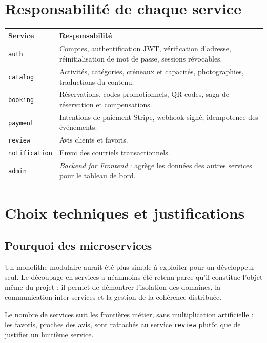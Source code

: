 \documentclass[11pt,a4paper]{report}
\begin{document}
\section{Responsabilité de chaque service}

\begin{longtable}{@{}p{2.6cm}p{11.9cm}@{}}
\toprule
\textbf{Service} & \textbf{Responsabilité} \\
\midrule
\endhead
\texttt{auth} & Comptes, authentification JWT, vérification d'adresse,
réinitialisation de mot de passe, sessions révocables. \\
\addlinespace
\texttt{catalog} & Activités, catégories, créneaux et capacités, photographies,
traductions du contenu. \\
\addlinespace
\texttt{booking} & Réservations, codes promotionnels, QR codes,
saga de réservation et compensations. \\
\addlinespace
\texttt{payment} & Intentions de paiement Stripe, webhook signé, idempotence
des événements. \\
\addlinespace
\texttt{review} & Avis clients et favoris. \\
\addlinespace
\texttt{notification} & Envoi des courriels transactionnels. \\
\addlinespace
\texttt{admin} & \emph{Backend for Frontend} : agrège les données des autres
services pour le tableau de bord. \\
\bottomrule
\end{longtable}

\section{Choix techniques et justifications}

\subsection{Pourquoi des microservices}

Un monolithe modulaire aurait été plus simple à exploiter pour un développeur
seul. Le découpage en services a néanmoins été retenu parce qu'il constitue
l'objet même du projet : il permet de démontrer l'isolation des domaines, la
communication inter-services et la gestion de la cohérence distribuée.

Le nombre de services suit les frontières métier, sans multiplication
artificielle : les favoris, proches des avis, sont rattachés au service
\texttt{review} plutôt que de justifier un huitième service.
\end{document}
